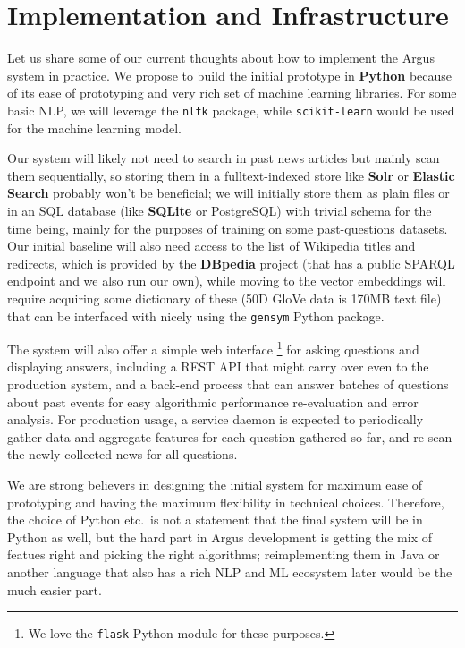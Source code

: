 \documentclass[11pt,a4paper]{article}
\begin{document}
\section{Implementation and Infrastructure}
\label{infra}

Let us share some of our current thoughts about how to implement the Argus system in practice.
We propose to build the initial prototype in \textbf{Python} because of its ease of
prototyping and very rich set of machine learning libraries.
For some basic NLP, we will leverage the \texttt{nltk} package,
while \texttt{scikit-learn} would be used
for the machine learning model.

Our system will likely not need to search in past news articles
but mainly scan them sequentially, so storing them in a fulltext-indexed
store like \textbf{Solr} or \textbf{Elastic Search} probably won't be
beneficial; we will initially store them as plain files or in an SQL
database (like \textbf{SQLite} or PostgreSQL) with trivial schema for the time being,
mainly for the purposes of training on some past-questions datasets.
Our initial baseline will also need access to the list of Wikipedia
titles and redirects, which is provided by the \textbf{DBpedia} project (that
has a public SPARQL endpoint and we also run our own), while moving
to the vector embeddings will require acquiring some dictionary of
these (50D GloVe data is 170MB text file) that can be interfaced with
nicely using the \texttt{gensym} Python package.

The system will also offer a simple web interface%
\footnote{We love the \texttt{flask} Python module for these purposes.}
for asking questions
and displaying answers, including a REST API that might carry over even
to the production system, and a back-end process that can answer batches
of questions about past events for easy algorithmic performance re-evaluation
and error analysis.
For production usage,
a service daemon is expected to periodically gather data and aggregate
features for each question gathered so far, and re-scan the newly collected
news for all questions.

We are strong believers in designing the initial system for maximum
ease of prototyping and having the maximum flexibility in technical
choices.  Therefore, the choice of Python etc.\ is not a statement
that the final system will be in Python as well, but the hard part
in Argus development is getting the mix of featues right and picking
the right algorithms; reimplementing them in Java or another language
that also has a rich NLP and ML ecosystem later would be the much easier
part.
\end{document}
